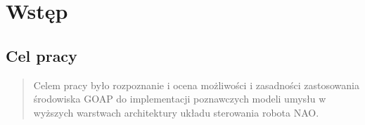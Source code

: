 {
\chapter{Wstęp}

\section{Cel pracy}

\begin{quote}
Celem pracy było rozpoznanie i ocena możliwości i zasadności zastosowania środowiska GOAP do implementacji poznawczych modeli umysłu w wyższych warstwach architektury układu sterowania robota NAO. 
\end{quote}



}